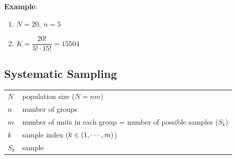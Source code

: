 \vspace{0.5cm}
\textbf{Example}:
\begin{enumerate}[itemsep=0.3cm]
    \item[] $N = 20,\ n = 5$

    \item[] $K = \dfrac{20!}{5!\cdot 15!}=15504$

    
\end{enumerate}





\subsection{Systematic Sampling \cite{statistics/book/Statistics-for-Data-Scientists/Maurits-Kaptein}}\label{Sampling Plans/Representative Sampling/Systematic Sampling}

\begin{table}[H]
    \centering
    \begin{tabular}{l l}
        $N$ & population size ($N=nm$)\\
        $n$ & number of groups \\
        $m$ & number of units in each group = number of possible samples ($S_k$)\\
        $k$ & sample index ($k \in \left(1,\cdots,m\right)$) \\
        $S_k$ & sample\\
    \end{tabular}
\end{table}


